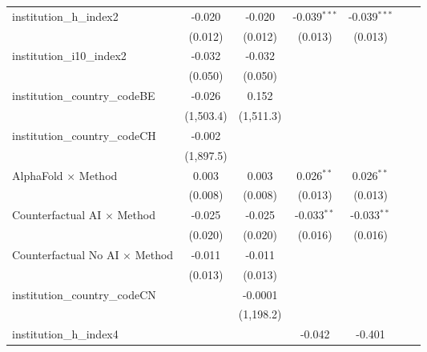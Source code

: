 \begin{tabular}{lcccccc}
   institution\_h\_index2                & -0.020       & -0.020       & -0.039$^{***}$ & -0.039$^{***}$ &     &   \\   
                                         & (0.012)      & (0.012)      & (0.013)        & (0.013)        &     &   \\   
   institution\_i10\_index2              & -0.032       & -0.032       &                &                &     &   \\   
                                         & (0.050)      & (0.050)      &                &                &     &   \\   
   institution\_country\_codeBE          & -0.026       & 0.152        &                &                &     &   \\   
                                         & (1,503.4)    & (1,511.3)    &                &                &     &   \\   
   institution\_country\_codeCH          & -0.002       &              &                &                &     &   \\   
                                         & (1,897.5)    &              &                &                &     &   \\   
   AlphaFold $\times$ Method             & 0.003        & 0.003        & 0.026$^{**}$   & 0.026$^{**}$   &     &   \\   
                                         & (0.008)      & (0.008)      & (0.013)        & (0.013)        &     &   \\   
   Counterfactual AI $\times$ Method     & -0.025       & -0.025       & -0.033$^{**}$  & -0.033$^{**}$  &     &   \\   
                                         & (0.020)      & (0.020)      & (0.016)        & (0.016)        &     &   \\   
   Counterfactual No AI $\times$ Method  & -0.011       & -0.011       &                &                &     &   \\   
                                         & (0.013)      & (0.013)      &                &                &     &   \\   
   institution\_country\_codeCN          &              & -0.0001      &                &                &     &   \\   
                                         &              & (1,198.2)    &                &                &     &   \\   
   institution\_h\_index4                &              &              & -0.042         & -0.401         &     &   \\   

\end{tabular}
